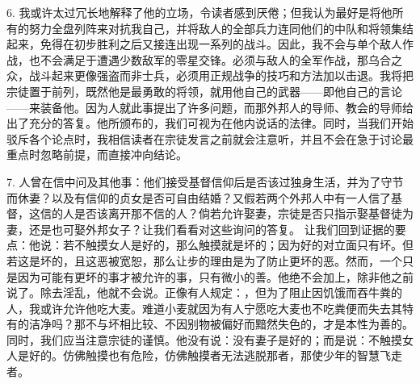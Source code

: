 6. 我或许太过冗长地解释了他的立场，令读者感到厌倦；但我认为最好是将他所有的努力全盘列阵来对抗我自己，并将敌人的全部兵力连同他们的中队和将领集结起来，免得在初步胜利之后又接连出现一系列的战斗。因此，我不会与单个敌人作战，也不会满足于遭遇少数敌军的零星交锋。必须与敌人的全军作战，那乌合之众，战斗起来更像强盗而非士兵，必须用正规战争的技巧和方法加以击退。我将把宗徒置于前列，既然他是最勇敢的将领，就用他自己的武器——即他自己的言论——来装备他。因为人就此事提出了许多问题，而那外邦人的导师、教会的导师给出了充分的答复。他所颁布的，我们可视为在他内说话的法律。同时，当我们开始驳斥各个论点时，我相信读者在宗徒发言之前就会注意听，并且不会在急于讨论最重点时忽略前提，而直接冲向结论。\par

7. 人曾在信中问及其他事：他们接受基督信仰后是否该过独身生活，并为了守节而休妻？以及有信仰的贞女是否可自由结婚？又假若两个外邦人中有一人信了基督，这信的人是否该离开那不信的人？倘若允许娶妻，宗徒是否只指示娶基督徒为妻，还是也可娶外邦女子？让我们看看对这些询问的答复。\newline{}  让我们回到证据的要点：他说：若不触摸女人是好的，那么触摸就是坏的；因为好的对立面只有坏。但若这是坏的，且这恶被宽恕，那么让步的理由是为了防止更坏的恶。然而，一个只是因为可能有更坏的事才被允许的事，只有微小的善。他绝不会加上，除非他之前说了。除去淫乱，他就不会说。正像有人规定：，但为了阻止因饥饿而吞牛粪的人，我或许允许他吃大麦。难道小麦就因为有人宁愿吃大麦也不吃粪便而失去其特有的洁净吗？那不与坏相比较、不因别物被偏好而黯然失色的，才是本性为善的。同时，我们应当注意宗徒的谨慎。他没有说：没有妻子是好的；而是说：不触摸女人是好的。仿佛触摸也有危险，仿佛触摸者无法逃脱那者，那使少年的智慧飞走者。 